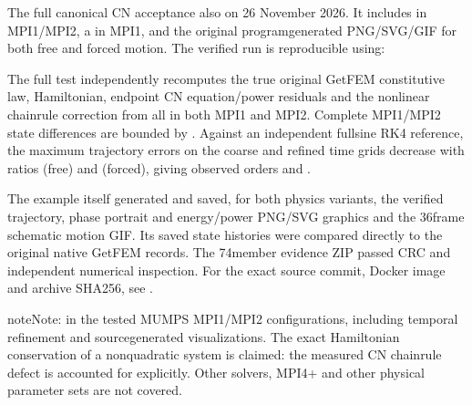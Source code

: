 \documentclass[letterpaper,10pt,english]{sphinxmanual}
\begin{document}
\sphinxAtStartPar
The full  canonical CN acceptance
also  on 26 November 2026. It
includes  in MPI1/MPI2, a  in MPI1, and the original
program\sphinxhyphen{}generated PNG/SVG/GIF for both free and
forced motion. The verified run is reproducible using:

\begin{sphinxVerbatim}[commandchars=\\\{\}]
\end{sphinxVerbatim}

\sphinxAtStartPar
The full test independently recomputes the true original
GetFEM  constitutive law, Hamiltonian,
endpoint CN equation/power residuals and the nonlinear
chain\sphinxhyphen{}rule correction from all  in both MPI1 and MPI2. Complete
MPI1/MPI2 state differences are bounded by
. Against an independent full\sphinxhyphen{}sine RK4
reference, the maximum trajectory errors on the
coarse and refined time grids decrease with ratios
 (free) and  (forced),
giving observed orders  and .

\sphinxAtStartPar
The example itself generated and saved, for both
physics variants, the verified trajectory, phase
portrait and energy/power PNG/SVG graphics and the
36\sphinxhyphen{}frame schematic motion GIF. Its saved state
histories were compared directly to the original
native GetFEM records. The 74\sphinxhyphen{}member evidence ZIP
passed CRC and independent numerical inspection.
For the exact source commit, Docker image and
archive SHA256, see
.

\begin{sphinxadmonition}{note}{Note:}
\sphinxAtStartPar
{} in the tested
MUMPS MPI1/MPI2 configurations, including temporal
refinement and source\sphinxhyphen{}generated visualizations.
The exact Hamiltonian conservation of a
nonquadratic system is  claimed: the
measured CN chain\sphinxhyphen{}rule defect is accounted
for explicitly. Other solvers, MPI4+ and other
physical parameter sets are not covered.
\end{sphinxadmonition}
\end{document}
